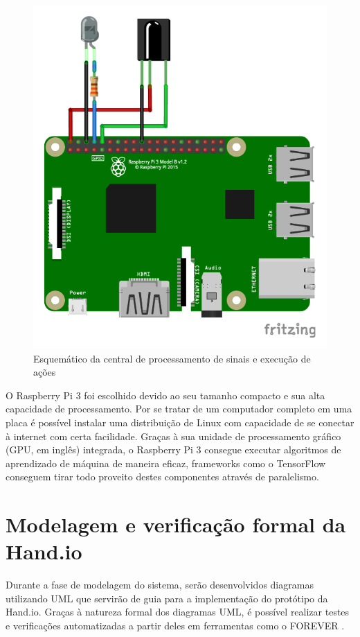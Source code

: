 \begin{figure}[ht]
    \centering
    \includegraphics{resources/esquematico_central_bb.pdf}
    \caption{Esquemático da central de processamento de sinais e execução de ações}
    \label{fig:esq_central}
\end{figure}

O Raspberry Pi 3 \cite{raspberry:pi3} foi escolhido devido ao seu tamanho compacto e sua alta capacidade de processamento. Por se tratar de um computador completo em uma placa é possível instalar uma distribuição de Linux com capacidade de se conectar à internet com certa facilidade. Graças à sua unidade de processamento gráfico (GPU, em inglês) integrada, o Raspberry Pi 3 consegue executar algoritmos de aprendizado de máquina de maneira eficaz, frameworks como o TensorFlow conseguem tirar todo proveito destes componentes através de paralelismo.

\section{Modelagem e verificação formal da Hand.io}

Durante a fase de modelagem do sistema, serão desenvolvidos diagramas utilizando UML que servirão de guia para a implementação do protótipo da Hand.io. Graças à natureza formal dos diagramas UML, é possível realizar testes e verificações automatizadas a partir deles em ferramentas como o FOREVER \cite{forever}.

